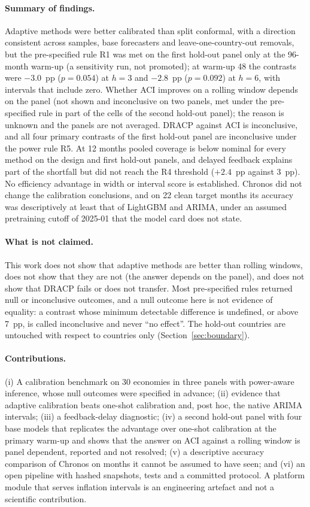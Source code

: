 \paragraph{Summary of findings.} Adaptive methods were better calibrated than split conformal, with a direction consistent across samples, base forecasters and leave-one-country-out removals, but the pre-specified rule R1 was met on the first hold-out panel only at the 96-month warm-up (a sensitivity run, not promoted); at warm-up 48 the contrasts were $-3.0$~pp ($p=0.054$) at $h=3$ and $-2.8$~pp ($p=0.092$) at $h=6$, with intervals that include zero. Whether ACI improves on a rolling window depends on the panel (not shown and inconclusive on two panels, met under the pre-specified rule in part of the cells of the second hold-out panel); the reason is unknown and the panels are not averaged. DRACP against ACI is inconclusive, and all four primary contrasts of the first hold-out panel are inconclusive under the power rule R5. At 12 months pooled coverage is below nominal for every method on the design and first hold-out panels, and delayed feedback explains part of the shortfall but did not reach the R4 threshold ($+2.4$~pp against 3~pp). No efficiency advantage in width or interval score is established. Chronos did not change the calibration conclusions, and on 22 clean target months its accuracy was descriptively at least that of LightGBM and ARIMA, under an assumed pretraining cutoff of 2025-01 that the model card does not state. \ExplainerStatus{}

\paragraph{What is not claimed.} This work does not show that adaptive methods are better than rolling windows, does not show that they are not (the answer depends on the panel), and does not show that DRACP fails or does not transfer. Most pre-specified rules returned null or inconclusive outcomes, and a null outcome here is not evidence of equality: a contrast whose minimum detectable difference is undefined, or above 7~pp, is called inconclusive and never ``no effect''. The hold-out countries are untouched with respect to countries only (Section~\ref{sec:boundary}).

\paragraph{Contributions.} (i) A calibration benchmark on 30 economies in three panels with power-aware inference, whose null outcomes were specified in advance; (ii) evidence that adaptive calibration beats one-shot calibration and, post hoc, the native ARIMA intervals; (iii) a feedback-delay diagnostic; (iv) a second hold-out panel with four base models that replicates the advantage over one-shot calibration at the primary warm-up and shows that the answer on ACI against a rolling window is panel dependent, reported and not resolved; (v) a descriptive accuracy comparison of Chronos on months it cannot be assumed to have seen; and (vi) an open pipeline with hashed snapshots, tests and a committed protocol. A platform module that serves inflation intervals is an engineering artefact and not a scientific contribution.

